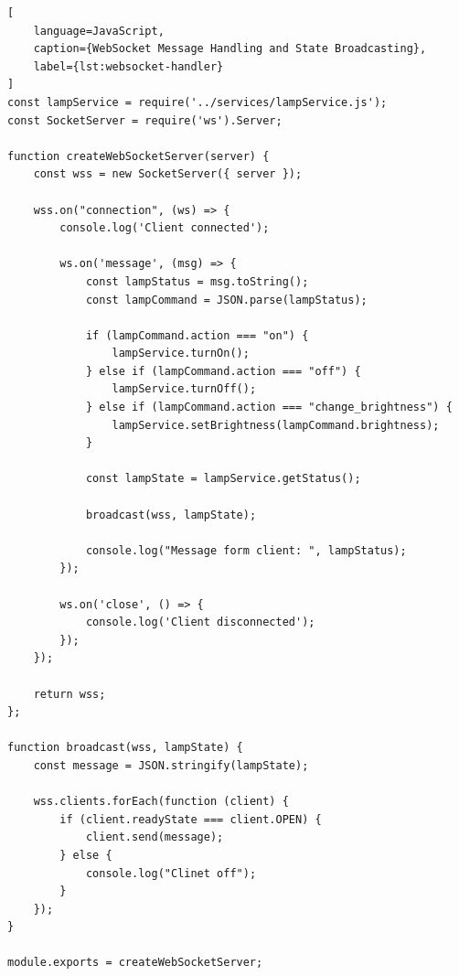 \documentclass[12pt,a4paper]{article}
\begin{document}
\begin{lstlisting}[
    language=JavaScript,
    caption={WebSocket Message Handling and State Broadcasting},
    label={lst:websocket-handler}
]
const lampService = require('../services/lampService.js');
const SocketServer = require('ws').Server;

function createWebSocketServer(server) {
    const wss = new SocketServer({ server });

    wss.on("connection", (ws) => {
        console.log('Client connected');

        ws.on('message', (msg) => {
            const lampStatus = msg.toString();
            const lampCommand = JSON.parse(lampStatus);

            if (lampCommand.action === "on") {
                lampService.turnOn();
            } else if (lampCommand.action === "off") {
                lampService.turnOff();
            } else if (lampCommand.action === "change_brightness") {
                lampService.setBrightness(lampCommand.brightness);
            }

            const lampState = lampService.getStatus();

            broadcast(wss, lampState);

            console.log("Message form client: ", lampStatus);
        });

        ws.on('close', () => {
            console.log('Client disconnected');
        });
    });

    return wss;
};

function broadcast(wss, lampState) {
    const message = JSON.stringify(lampState);

    wss.clients.forEach(function (client) {
        if (client.readyState === client.OPEN) {
            client.send(message);
        } else {
            console.log("Clinet off");
        }
    });
}

module.exports = createWebSocketServer;
\end{lstlisting}


\end{document}

